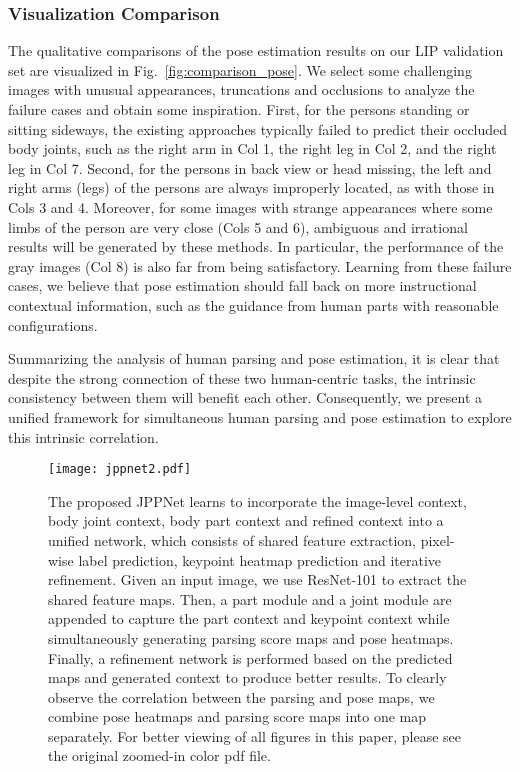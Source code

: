 \documentclass[10pt,journal,compsoc]{IEEEtran}
\begin{document}
\subsubsection{Visualization Comparison}
The qualitative comparisons of the pose estimation results on our LIP validation set are visualized in Fig.~\ref{fig:comparison_pose}. We select some challenging images with unusual appearances, truncations and occlusions to analyze the failure cases and obtain some inspiration. First, for the persons standing or sitting sideways, the existing approaches typically failed to predict their occluded body joints, such as the right arm in Col 1, the right leg in Col 2, and the right leg in Col 7. Second, for the persons in back view or head missing,  the left and right arms (legs) of the persons are always improperly located, as with those in Cols 3 and 4. Moreover, for some images with strange appearances where some limbs of the person are very close (Cols 5 and 6), ambiguous and irrational results will be generated by these methods. In particular, the performance of the gray images (Col 8) is also far from being satisfactory. Learning from these failure cases, we believe that pose estimation should fall back on more instructional contextual information, such as the guidance from human parts with reasonable configurations. 

Summarizing the analysis of human parsing and pose estimation, it is clear that despite the strong connection of these two human-centric tasks, the intrinsic consistency between them will benefit each other. Consequently, we present a unified framework for simultaneous human parsing and pose estimation to explore this intrinsic correlation.



\begin{figure*}[t]
\centering
  \texttt{[image: jppnet2.pdf]}
\vspace{-4mm}
\caption{The proposed JPPNet learns to incorporate the image-level context, body joint context, body part context and refined context into a unified network, which consists of shared feature extraction, pixel-wise label prediction, keypoint heatmap prediction and iterative refinement. Given an input image, we use ResNet-101 to extract the shared feature maps. Then, a part module and a joint module are appended to capture the part context and keypoint context while simultaneously generating parsing score maps and pose heatmaps. Finally, a refinement network is performed based on the predicted maps and generated context to produce better results. To clearly observe the correlation between the parsing and pose maps, we combine pose heatmaps and parsing score maps into one map separately. For better viewing of all figures in this paper, please see the original zoomed-in color pdf file.}
\vspace{-4mm}
\label{fig:jppnet}
\end{figure*}
\end{document}
